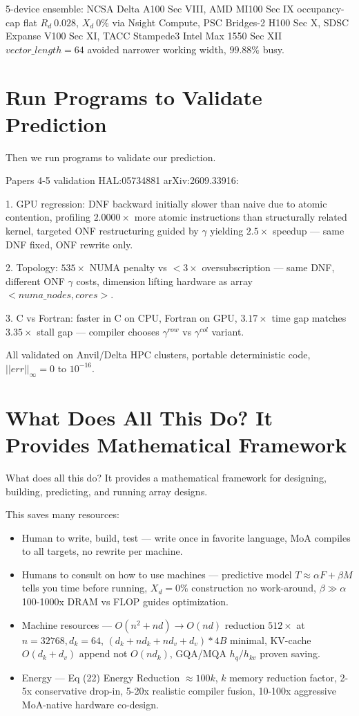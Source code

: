 \documentclass[11pt,a4paper]{article}
\begin{document}
5-device ensemble: NCSA Delta A100 Sec VIII, AMD MI100 Sec IX occupancy-cap flat $R_d\ 0.028$, $X_d\ 0\%$ via Nsight Compute, PSC Bridges-2 H100 Sec X, SDSC Expanse V100 Sec XI, TACC Stampede3 Intel Max 1550 Sec XII $vector\_length=64$ avoided narrower working width, $99.88\%$ busy.

\section{Run Programs to Validate Prediction}

Then we run programs to validate our prediction.

Papers 4-5 validation HAL:05734881 arXiv:2609.33916:

1. GPU regression: DNF backward initially slower than naive due to atomic contention, profiling $2.0000\times$ more atomic instructions than structurally related kernel, targeted ONF restructuring guided by $\gamma$ yielding $2.5\times$ speedup — same DNF fixed, ONF rewrite only.

2. Topology: $535\times$ NUMA penalty vs $<3\times$ oversubscription — same DNF, different ONF $\gamma$ costs, dimension lifting hardware as array $<numa\_nodes,cores>$.

3. C vs Fortran: faster in C on CPU, Fortran on GPU, $3.17\times$ time gap matches $3.35\times$ stall gap — compiler chooses $\gamma^{row}$ vs $\gamma^{col}$ variant.

All validated on Anvil/Delta HPC clusters, portable deterministic code, $||err||_{\infty}=0$ to $10^{-16}$.

\section{What Does All This Do? It Provides Mathematical Framework}

What does all this do? It provides a mathematical framework for designing, building, predicting, and running array designs.

This saves many resources:
\begin{itemize}
\item Human to write, build, test — write once in favorite language, MoA compiles to all targets, no rewrite per machine.
\item Humans to consult on how to use machines — predictive model $T\approx\alpha F+\beta M$ tells you time before running, $X_d=0\%$ construction no work-around, $\beta\gg\alpha$ 100-1000x DRAM vs FLOP guides optimization.
\item Machine resources — $O(n^2+nd)\rightarrow O(nd)$ reduction $512\times$ at $n=32768,d_k=64$, $(d_k+nd_k+nd_v+d_v)*4B$ minimal, KV-cache $O(d_k+d_v)$ append not $O(n d_k)$, GQA/MQA $h_q/h_{kv}$ proven saving.
\item Energy — Eq (22) Energy Reduction $\approx100k$, $k$ memory reduction factor, 2-5x conservative drop-in, 5-20x realistic compiler fusion, 10-100x aggressive MoA-native hardware co-design.
\end{itemize}
\end{document}
